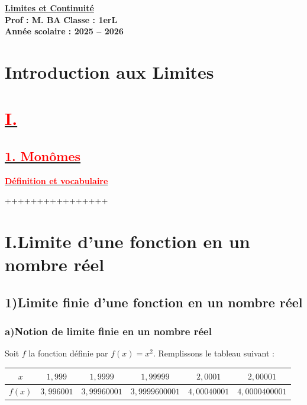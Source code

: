 \documentclass[12pt,a4paper]{article}
\begin{document}
\begin{center}
    \Large\textbf{\underline{Limites et Continuité}}\\[-0.1cm]
    \normalsize\textbf{Prof : M. BA} \hfill \textbf{Classe : 1erL}\\[-0.1cm]
    \textbf{Année scolaire : 2025 -- 2026}
\end{center}

\section*{Introduction aux Limites}

\section*{\underline{\textbf{\textcolor{red}{I.  }}}}
\subsection*{\underline{\textbf{\textcolor{red}{1. Monômes}}}} 
\underline{\textbf{\textcolor{red}{Définition et vocabulaire}}}

++++++++++++++++
\section*{I.\quad Limite d’une fonction en un nombre réel}

\subsection*{1)\quad Limite finie d’une fonction en un nombre réel}

\subsubsection*{a)\quad Notion de limite finie en un nombre réel}

Soit $f$ la fonction définie par $f(x)=x^2$. Remplissons le tableau suivant :

\begin{center}
\begin{tabular}{|c|c|c|c|c|c|}
\hline
$x$ & $1{,}999$ & $1{,}9999$ & $1{,}99999$ & $2{,}0001$ & $2{,}00001$ \\
\hline
$f(x)$ & $3{,}996001$ & $3{,}99960001$ & $3{,}9999600001$ & $4{,}00040001$ & $4{,}0000400001$ \\
\hline
\end{tabular}
\end{center}
\end{document}
